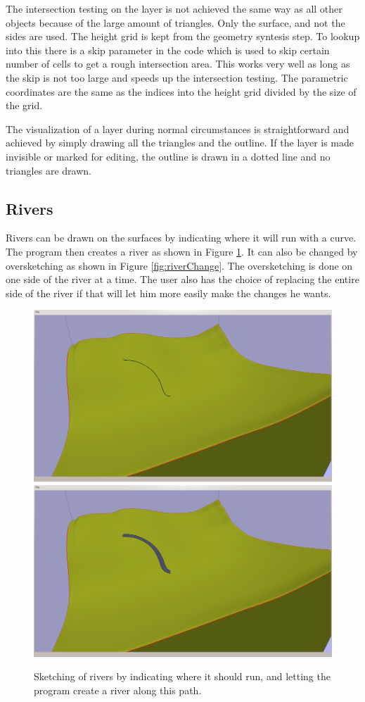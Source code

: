 \documentclass[a4paper,12pt]{report}
\begin{document}
The intersection testing on the layer is not achieved the same way as all other objects because of the large amount of triangles. Only the surface, and not the sides are used. The height grid is kept from the geometry syntesis step. To lookup into this there is a skip parameter in the code which is used to skip certain number of cells to get a rough intersection area. This works very well as long as the skip is not too large and speeds up the intersection testing. The parametric coordinates are the same as the indices into the height grid divided by the size of the grid.

The visualization of a layer during normal circumstances is straightforward and achieved by simply drawing all the triangles and the outline. If the layer is made invisible or marked for editing, the outline is drawn in a dotted line and no triangles are drawn.

\subsection{Rivers}
Rivers can be drawn on the surfaces by indicating where it will run with a curve. The program then creates a river as shown in Figure \ref{fig:riverDraw}. It can also be changed by oversketching as shown in Figure \ref{fig:riverChange}. The oversketching is done on one side of the river at a time. The user also has the choice of replacing the entire side of the river if that will let him more easily make the changes he wants.

\begin{figure}
\includegraphics[trim = 30mm 80mm 120mm 30mm, clip,width=.5\linewidth]{thesis/results/riverDraw.png}
\includegraphics[trim = 30mm 80mm 120mm 30mm, clip,width=.5\linewidth]{thesis/results/riverDrawn.png}
 \caption{Sketching of rivers by indicating where it should run, and letting the program create a river along this path. }
 \label{fig:riverDraw}
\end{figure}
\end{document}
